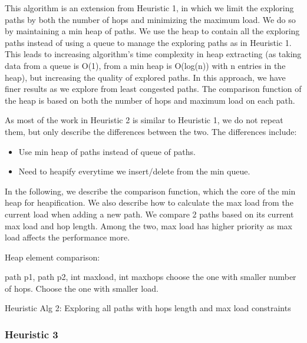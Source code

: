 This algorithm is an extension from Heuristic 1, in which we limit the exploring paths by both the number of hops and minimizing the maximum load. We do so by maintaining a min heap of paths. We use the heap to contain all the exploring paths instead of using a queue to manage the exploring paths as in Heuristic 1. This leads to increasing algorithm's time complexity in heap extracting (as taking data from a queue is O(1), from a min heap is O(log(n)) with n entries in the heap), but increasing the quality of explored paths. In this approach, we have finer results as we explore from least congested paths. The comparison function of the heap is based on both the number of hops and maximum load on each path. 

As most of the work in Heuristic 2 is similar to Heuristic 1, we do not repeat them, but only describe the differences between the two. The differences include:
\begin{itemize}
\item Use min heap of paths instead of queue of paths.
\item Need to heapify everytime we insert/delete from the min queue.
\end{itemize}

In the following, we describe the comparison function, which the core of the min heap for heapification. We also describe how to calculate the max load from the current load when adding a new path. We compare 2 paths based on its current max load and hop length. Among the two, max load has higher priority as max load affects the performance more.

\begin{algorithm}[!htp]

Heap element comparison:
    \begin{algorithmic}
	 {path p1, path p2, int maxload, int maxhops}
		\State choose the one with smaller number of hops.
	    \EndIf
		\State Choose the one with smaller load.
	    \EndIf
        \EndFunction
    \end{algorithmic}

\caption{Heuristic Alg 2: Exploring all paths with hops length and max load constraints}
\label{alg:h2}
\end{algorithm}

\subsubsection{Heuristic 3}

